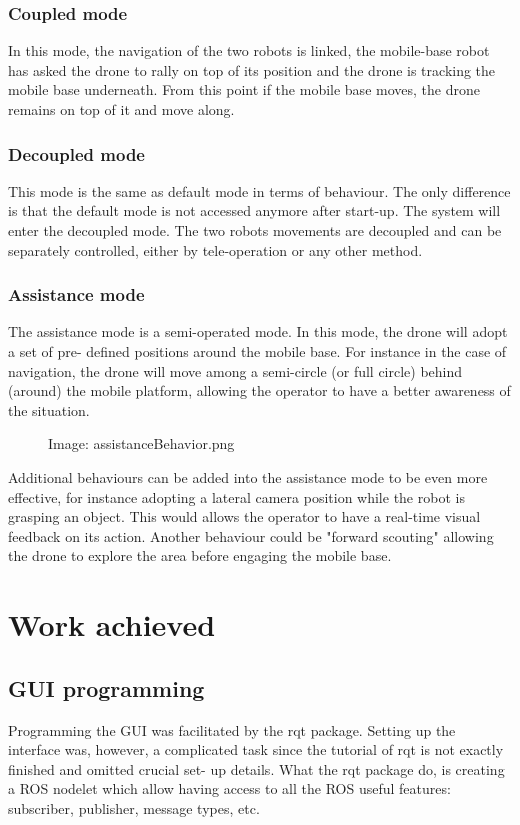 \documentclass[11pt,a4paper]{article}
\newcommand{\centerImage}[1]{
	\begin{figure}[h]
	\centering
	Image: #1
	\end{figure}
}
\begin{document}
\subsubsection{Coupled mode}
In this mode, the navigation of the two robots is linked, the mobile-base robot has asked the drone to 
rally on top of its position and the drone is tracking the mobile base underneath. From this point if the mobile base moves, the drone remains on top of it and move along.

\subsubsection{Decoupled mode}
This mode is the same as default mode in terms of behaviour. The only difference is that the default mode
is not accessed anymore after start-up. The system will enter the decoupled mode. The two robots movements
are decoupled and can be separately controlled, either by tele-operation or any other method.

\subsubsection{Assistance mode}
The assistance mode is a semi-operated mode. In this mode, the drone will adopt a set of pre-
defined
positions around the mobile base. For instance in the case of navigation, the drone will move 
among a semi-circle (or full circle) behind (around) the mobile platform, allowing the 
operator to have a better awareness of the situation.

\centerImage{assistanceBehavior.png}

Additional behaviours can be added into the assistance mode to be even more effective, for
 instance adopting a lateral camera position while the robot is grasping an object. This would
  allows the operator to have a real-time visual feedback on its action. Another behaviour
   could be "forward scouting" allowing the drone to explore the area before engaging the 
   mobile base.

\section{Work achieved}

\subsection{GUI programming}
Programming the GUI was facilitated by the rqt package. Setting up the interface was, however,
 a complicated task since the tutorial of rqt is not exactly finished and omitted crucial set-
 up details. What the rqt package do, is creating a ROS nodelet which allow having access to
all the ROS useful features: subscriber, publisher, message types, etc.
\end{document}
